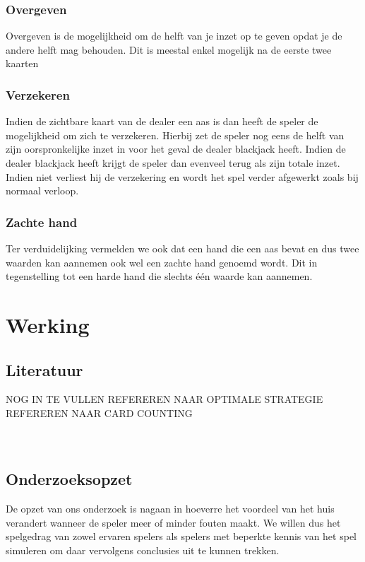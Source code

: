 \documentclass[conference]{IEEEtran}
\begin{document}
\subsubsection{Overgeven}
Overgeven is de mogelijkheid om de helft van je inzet op te geven opdat je de andere helft mag behouden. Dit is meestal enkel mogelijk na de eerste twee kaarten

\subsubsection{Verzekeren}
Indien de zichtbare kaart van de dealer een aas is dan heeft de speler de mogelijkheid om zich te verzekeren. Hierbij zet de speler nog eens de helft van zijn oorspronkelijke inzet in voor het geval de dealer blackjack heeft. Indien de dealer blackjack heeft krijgt de speler dan evenveel terug als zijn totale inzet. Indien niet verliest hij de verzekering en wordt het spel verder afgewerkt zoals bij normaal verloop.

\subsubsection{Zachte hand}
Ter verduidelijking vermelden we ook dat een hand die een aas bevat en dus twee waarden kan aannemen ook wel een zachte hand genoemd wordt. Dit in tegenstelling tot een harde hand die slechts \'e\'en waarde kan aannemen.

\section{Werking}
\subsection{Literatuur}
NOG IN TE VULLEN
REFEREREN NAAR OPTIMALE STRATEGIE
REFEREREN NAAR CARD COUNTING
\\
\\
\\

\cite{thorp1961favorable}

\subsection{Onderzoeksopzet}
De opzet van ons onderzoek is nagaan in hoeverre het voordeel van het huis verandert wanneer de speler meer of minder fouten maakt. We willen dus het spelgedrag van zowel ervaren spelers als spelers met beperkte kennis van het spel simuleren om daar vervolgens conclusies uit te kunnen trekken.
\end{document}

